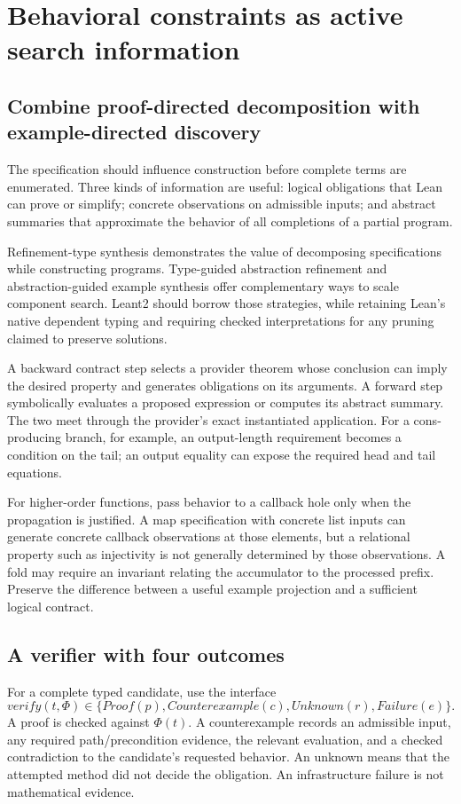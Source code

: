 \section{Behavioral constraints as active search information}
\label{sec:behavior}
\subsection{Combine proof-directed decomposition with example-directed discovery}
The specification should influence construction before complete terms are enumerated. Three kinds of information are useful: logical obligations that Lean can prove or simplify; concrete observations on admissible inputs; and abstract summaries that approximate the behavior of all completions of a partial program.

Refinement-type synthesis demonstrates the value of decomposing specifications while constructing programs. Type-guided abstraction refinement and abstraction-guided example synthesis offer complementary ways to scale component search. Leant2 should borrow those strategies, while retaining Lean's native dependent typing and requiring checked interpretations for any pruning claimed to preserve solutions.\cite{synquid,tygar,syngar}

A backward contract step selects a provider theorem whose conclusion can imply the desired property and generates obligations on its arguments. A forward step symbolically evaluates a proposed expression or computes its abstract summary. The two meet through the provider's exact instantiated application. For a cons-producing branch, for example, an output-length requirement becomes a condition on the tail; an output equality can expose the required head and tail equations.

For higher-order functions, pass behavior to a callback hole only when the propagation is justified. A map specification with concrete list inputs can generate concrete callback observations at those elements, but a relational property such as injectivity is not generally determined by those observations. A fold may require an invariant relating the accumulator to the processed prefix. Preserve the difference between a useful example projection and a sufficient logical contract.

\subsection{A verifier with four outcomes}
For a complete typed candidate, use the interface
\[
 \mathit{verify}(t,\Phi)\in
 \{\mathit{Proof}(p),\mathit{Counterexample}(c),
   \mathit{Unknown}(r),\mathit{Failure}(e)\}.
\]
A proof is checked against $\Phi(t)$. A counterexample records an admissible input, any required path/precondition evidence, the relevant evaluation, and a checked contradiction to the candidate's requested behavior. An unknown means that the attempted method did not decide the obligation. An infrastructure failure is not mathematical evidence.

